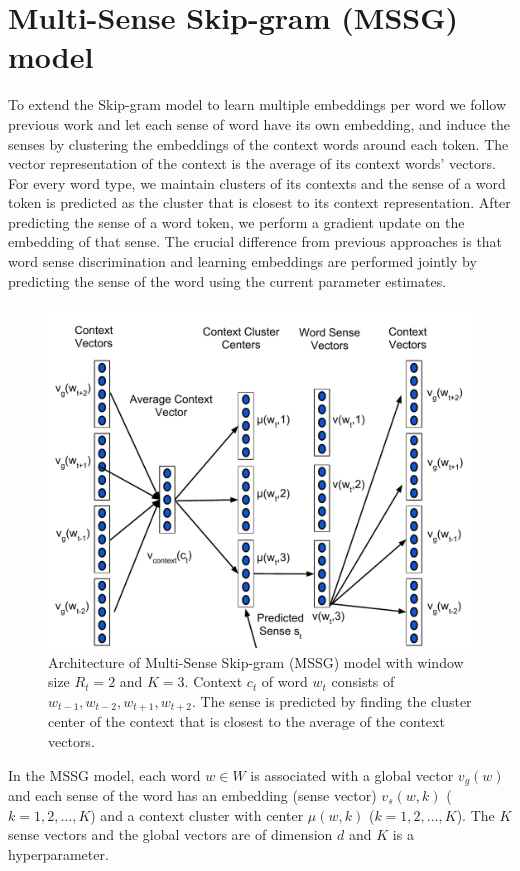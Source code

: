 \documentclass[11pt,a4paper]{article}
\begin{document}
\section{Multi-Sense Skip-gram (MSSG) model}
To extend the Skip-gram model to learn multiple embeddings per word  we follow previous work \cite{huang:2012,reisinger:2010b} and let each sense of word have its own embedding, and  induce the senses by clustering the embeddings of the context words around each token. The vector representation of the context is the average of its context words' vectors. For every word type, we maintain clusters of its contexts and the sense of a word token is predicted as the cluster that is closest to its context representation. After predicting the sense of a word token, we perform a gradient update on the embedding of that sense. The crucial difference from previous approaches is that word sense discrimination and learning embeddings are performed jointly by predicting the sense of the word using the current parameter estimates.

\begin{figure}
\includegraphics[scale=0.4]{images/ms_sg_google.pdf}
\caption{Architecture of Multi-Sense Skip-gram (MSSG) model with window size $R_{t}=2$ and $K=3$.  Context $c_t$ of word $w_t$  consists of $w_{t-1}, w_{t-2}, w_{t+1}, w_{t+2}$. The sense is predicted by finding the cluster center of the context that is closest to the average of the context vectors.}
\label{fig2}
\end{figure}

In the MSSG model, each word $w \in W$ is associated with a global vector $v_g(w)$ and each sense of the word has an embedding (sense vector) $v_{s}(w,k)$ ($k=1, 2, \ldots, K$) and  a context cluster with center $\mu(w,k)$ ($k=1, 2, \ldots, K$). The $K$ sense vectors and the global vectors are of dimension $d$ and $K$ is a hyperparameter.
\end{document}
